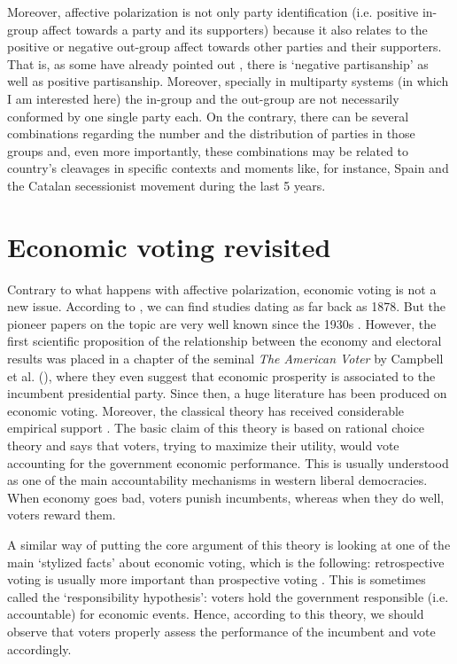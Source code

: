 \documentclass[a4paper, svgnames]{article}
\begin{document}
Moreover, affective polarization is not only party identification (i.e. positive in-group affect towards a party and its supporters) because it also relates to the positive or negative out-group affect towards other parties and their supporters. That is, as some have already pointed out \citep{Medeiros2013, Abramowitz2016}, there is `negative partisanship' as well as positive partisanship. Moreover, specially in multiparty systems (in which I am interested here) the in-group and the out-group are not necessarily conformed by one single party each. On the contrary, there can be several combinations regarding the number and the distribution of parties in those groups and, even more importantly, these combinations may be related to country's cleavages in specific contexts and moments like, for instance, Spain and the Catalan secessionist movement during the last 5 years.

\section{Economic voting revisited}

Contrary to what happens with affective polarization, economic voting is not a new issue. According to \cite{LewisBeck2007}, we can find studies dating as far back as 1878. But the pioneer papers on the topic are very well known since the 1930s \citep{Tibbitts2015, Gosnell1940, Wilkinson1950}. However, the first scientific proposition of the relationship between the economy and electoral results was placed in a chapter of the seminal \textit{The American Voter} by Campbell et al. (\citeyear[Chapter 14]{campbellAmericanVoter1960}), where they even suggest that economic prosperity is associated to the incumbent presidential party. Since then, a huge literature has been produced on economic voting. Moreover, the classical theory has received considerable empirical support \citep{Kinder1979, Lewis-Beck1988, Lewis-Beck2000, LewisBeck2007, Lewis-Beck2011}. The basic claim of this theory is based on rational choice theory and says that voters, trying to maximize their utility, would vote accounting for the government economic performance. This is usually understood as one of the main accountability mechanisms in western liberal democracies. When economy goes bad, voters punish incumbents, whereas when they do well, voters reward them.

A similar way of putting the core argument of this theory is looking at one of the main `stylized facts' about economic voting, which is the following: retrospective voting is usually more important than prospective voting \citep{Lewis-Beck2000}. This is sometimes called the `responsibility hypothesis': voters hold the government responsible (i.e. accountable) for economic events. Hence, according to this theory, we should observe that voters properly assess the performance of the incumbent and vote accordingly.
\end{document}
